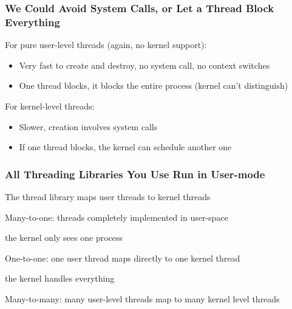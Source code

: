   \begin{frame}
    \frametitle{We Could Avoid System Calls, or Let a Thread Block Everything}

    For pure user-level threads (again, no kernel support):

    \begin{itemize}
      \item Very fast to create and destroy, no system call, no context switches
      \item One thread blocks, it blocks the entire process (kernel can't distinguish)
    \end{itemize}

    \vspace{2em}

    For kernel-level threads:

    \begin{itemize}
      \item Slower, creation involves system calls
      \item If one thread blocks, the kernel can schedule another one
    \end{itemize}
  \end{frame}

  \begin{frame}
    \frametitle{All Threading Libraries You Use Run in User-mode}

    The thread library maps user threads to kernel threads

    \vspace{2em}

    Many-to-one: threads completely implemented in user-space

    \hspace{2em} the kernel only sees one process

    \vspace{2em}

    One-to-one: one user thread maps directly to one kernel thread

    \hspace{2em} the kernel handles everything

    \vspace{2em}

    Many-to-many: many user-level threads map to many kernel level threads
  \end{frame}

